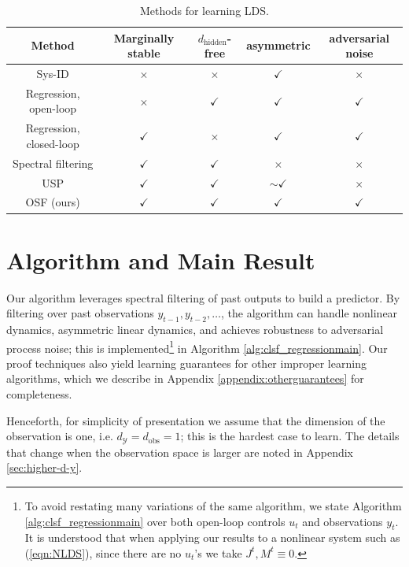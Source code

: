 \documentclass[11pt]{article}
\numberwithin{equation}{section}
\begin{document}
\begin{table}[h!]
    \centering
    \begin{tabular}{|c|c|c|c|c|}
    \hline
        Method & Marginally stable  & $d_{\text{hidden}}$-free  & asymmetric & adversarial noise \\
    \hline
    \hline
        Sys-ID  & $\times$ & $\times$ & $\checkmark$ & $\times $  \\
    \hline
        Regression, open-loop & $\times$ & $\checkmark$  &  $\checkmark$ & $\checkmark$  \\
    \hline
        Regression, closed-loop  & $\checkmark$ & $\times$ & $\checkmark$  & $\checkmark $ \\
    \hline
        Spectral filtering  \cite{hazan2017learning}& $\checkmark$ & $\checkmark$ & $\times$  & $\times $  \\
    \hline
        USP \cite{marsden2025universalsequencepreconditioning}   & $\checkmark$ & $\checkmark$ & $\sim \checkmark$  & $\times $  \\
    \hline
        OSF (ours)  & $\checkmark$ & $\checkmark$ & $\checkmark$  & $\checkmark $  \\
    \hline
    \end{tabular}
    \caption{Methods for learning LDS.}
    \label{tab:my_label}
\end{table}




\section{Algorithm and Main Result}
Our algorithm leverages spectral filtering of past outputs to build a predictor. By filtering over past observations $y_{t-1}, y_{t-2}, \ldots$, the algorithm can handle nonlinear dynamics, asymmetric linear dynamics, and achieves robustness to adversarial process noise; this is implemented\footnote{To avoid restating many variations of the same algorithm, we state Algorithm \ref{alg:clsf_regressionmain} over both open-loop controls $u_t$ and observations $y_t$. It is understood that when applying our results to a nonlinear system such as (\ref{eqn:NLDS}), since there are no $u_t$'s we take $J^t, M^t \equiv 0$.} in Algorithm \ref{alg:clsf_regressionmain}.  
Our proof techniques also yield learning guarantees for other improper learning algorithms, which we describe in Appendix \ref{appendix:otherguarantees} for completeness. 

 Henceforth, for simplicity of presentation we assume that the dimension of the observation is one, i.e. $d_\mathcal{Y}=d_{\mathrm{obs}}=1$; this is the hardest case to learn. The details that change when the observation space is larger are noted in Appendix \ref{sec:higher-d-y}. 
\end{document}
